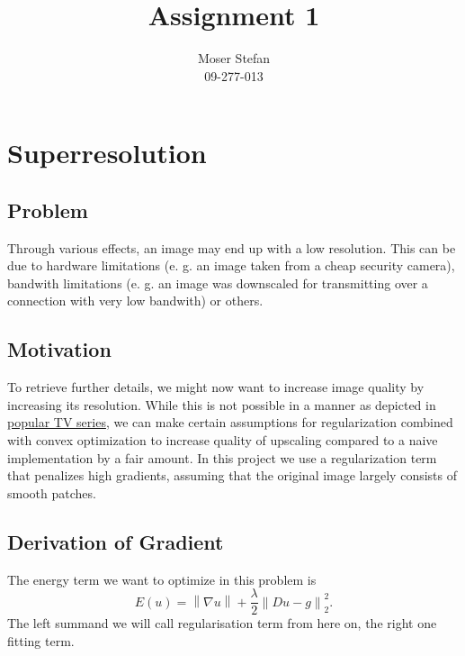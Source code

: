 \documentclass{paper}
\title{Assignment 1}
\author{Moser Stefan\\09-277-013}
\newcommand{\norm}[1]{\left\lVert#1\right\rVert}
\begin{document}
\maketitle


%

\section*{Superresolution}

\subsection*{Problem}
Through various effects, an image may end up with a low resolution. 
This can be due to hardware limitations 
(e. g. an image taken from a cheap security camera), 
bandwith limitations 
(e. g. an image was downscaled for transmitting over a connection with very low bandwith) or others.

\subsection*{Motivation}
To retrieve further details, we might now want to increase image quality by increasing its resolution. 
While this is not possible in a manner as depicted in \href{http://petapixel.com/2012/08/17/ridiculous-photo-enhancement-scene-from-the-tv-show-csi/}{popular TV series}, 
we can make certain assumptions for regularization combined with convex optimization to increase quality of upscaling compared to a naive implementation by a fair amount. 
In this project we use a regularization term that penalizes high gradients,
assuming that the original image largely consists of smooth patches.

\subsection*{Derivation of Gradient}

The energy term we want to optimize in this problem is 
\begin{equation}
E(u) = \norm{\nabla u} + \frac{\lambda}{2} \norm{Du - g}^2_2.
\end{equation}
The left summand we will call regularisation term from here on, 
the right one fitting term. 
\end{document}
